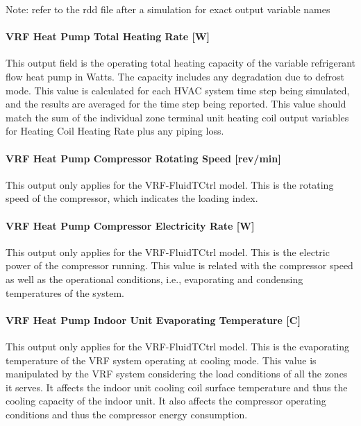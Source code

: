 Note: refer to the rdd file after a simulation for exact output variable names

\paragraph{VRF Heat Pump Total Heating Rate {[}W{]}}\label{vrf-heat-pump-total-heating-rate-w-fluidTCtrl}

This output field is the operating total heating capacity of the variable refrigerant flow heat pump in Watts. The capacity includes any degradation due to defrost mode. This value is calculated for each HVAC system time step being simulated, and the results are averaged for the time step being reported. This value should match the sum of the individual zone terminal unit heating coil output variables for Heating Coil Heating Rate plus any piping loss.

\paragraph{VRF Heat Pump Compressor Rotating Speed {[}rev/min{]}}\label{vrf-heat-pump-compressor-rotating-speed-revmin}

This output only applies for the VRF-FluidTCtrl model. This is the rotating speed of the compressor, which indicates the loading index.

\paragraph{VRF Heat Pump Compressor Electricity Rate {[}W{]}}\label{vrf-heat-pump-compressor-electric-power-at-cooling-mode-w}

This output only applies for the VRF-FluidTCtrl model. This is the electric power of the compressor running. This value is related with the compressor speed as well as the operational conditions, i.e., evaporating and condensing temperatures of the system.

\paragraph{VRF Heat Pump Indoor Unit Evaporating Temperature {[}C{]}}\label{vrf-heat-pump-indoor-unit-evaporating-temperature-at-cooling-mode-c}

This output only applies for the VRF-FluidTCtrl model. This is the evaporating temperature of the VRF system operating at cooling mode. This value is manipulated by the VRF system considering the load conditions of all the zones it serves. It affects the indoor unit cooling coil surface temperature and thus the cooling capacity of the indoor unit. It also affects the compressor operating conditions and thus the compressor energy consumption.


